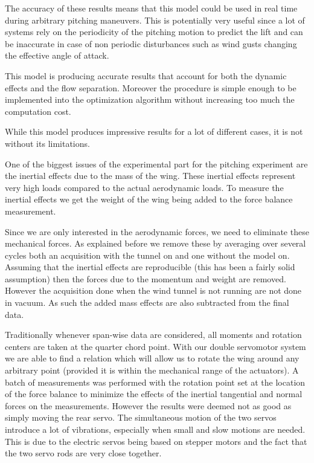 \par The accuracy of these results means that this model could be used in real time during arbitrary pitching maneuvers.
This is potentially very useful since a lot of systems rely on the periodicity of the pitching motion to predict the lift and can be inaccurate in case of non periodic disturbances such as wind gusts changing the effective angle of attack.

\FloatBarrier

\par This model is producing accurate results that account for both the dynamic effects and the flow separation.
Moreover the procedure is simple enough to be implemented into the optimization algorithm without increasing too much the computation cost.



While this model produces impressive results for a lot of different cases, it is not without its limitations.

 \label{subs:added_mass}
One of the biggest issues of the experimental part for the pitching experiment are the inertial effects due to the mass of the wing.
These inertial effects represent very high loads compared to the actual aerodynamic loads.
To measure the inertial effects we get the weight of the wing being added to the force balance measurement.

\par Since we are only interested in the aerodynamic forces, we need to eliminate these mechanical forces.
As explained before we remove these by averaging over several cycles both an acquisition with the tunnel on and one without the model on.
Assuming that the inertial effects are reproducible (this has been a fairly solid assumption) then the forces due to the momentum and weight are removed.
However the acquisition done when the wind tunnel is not running are not done in vacuum.
As such the added mass effects are also subtracted from the final data.

Traditionally whenever span-wise data are considered, all moments and rotation centers are taken at the quarter chord point.
With our double servomotor system we are able to find a relation which will allow us to rotate the wing around any arbitrary point (provided it is within the mechanical range of the actuators).
A batch of measurements was performed with the rotation point set at the location of the force balance to minimize the effects of the inertial tangential and normal forces on the measurements.
However the results were deemed not as good as simply moving the rear servo.
The simultaneous motion of the two servos introduce a lot of vibrations, especially when small and slow motions are needed.
This is due to the electric servos being based on stepper motors and the fact that the two servo rods are very close together.


